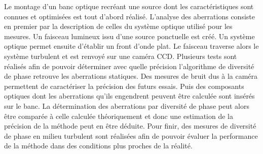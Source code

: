 Le montage d'un banc optique recréant une source dont les caractéristiques sont connues et optimisées est tout d'abord réalisé. L'analyse des aberrations consiste en premier par la description de celles du système optique utilisé pour les mesures. Un faisceau lumineux issu d'une source ponctuelle est créé. Un système optique permet ensuite d'établir un front d'onde plat. Le faisceau traverse alors le système turbulent et est renvoyé sur une caméra CCD. Plusieurs tests sont réalisés afin de pouvoir déterminer avec quelle précision l'algorithme de diversité de phase retrouve les aberrations statiques.
Des mesures de bruit dus à la caméra permettent de caractériser la précision des futurs essais.
Puis des composants optiques dont les aberrations qu'ils engendrent peuvent être calculée sont insérés sur le banc. La détermination des aberrations par diversité de phase peut alors être comparée à celle calculée théoriquement et donc une estimation de la précision de la méthode peut en être déduite.
Pour finir, des mesures de diversité de phase en milieu turbulent sont réalisées afin de pouvoir évaluer la performance de la méthode dans des conditions plus proches de la réalité. 



